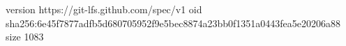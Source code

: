 version https://git-lfs.github.com/spec/v1
oid sha256:6e45f7877adfb5d680705952f9e5bec8874a23bb0f1351a0443fea5e20206a88
size 1083
